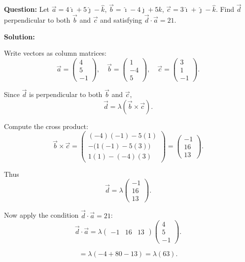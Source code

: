 \documentclass[journal]{IEEEtran}
\begin{document}
\textbf{Question:}  
Let $\vec a = 4\hat\imath+5\hat\jmath-\hat k$, $\vec b=\hat\imath-4\hat\jmath+5\hat k$, $\vec c=3\hat\imath+\hat\jmath-\hat k$.  
Find $\vec d$ perpendicular to both $\vec b$ and $\vec c$ and satisfying $\vec d\cdot\vec a=21$.

\medskip

\textbf{Solution:}  

Write vectors as column matrices:
\[
\vec a=\begin{pmatrix}4\\5\\-1\end{pmatrix},\quad
\vec b=\begin{pmatrix}1\\-4\\5\end{pmatrix},\quad
\vec c=\begin{pmatrix}3\\1\\-1\end{pmatrix}.
\]

Since $\vec d$ is perpendicular to both $\vec b$ and $\vec c$,  
\[
\vec d = \lambda(\vec b\times \vec c).
\]

Compute the cross product:
\[
\vec b\times \vec c =\begin{pmatrix}
(-4)(-1)-5(1)\\[6pt]
-\big(1(-1)-5(3)\big)\\[6pt]
1(1)-(-4)(3)
\end{pmatrix}
=
\begin{pmatrix}-1\\16\\13\end{pmatrix}.
\]

Thus
\[
\vec d = \lambda \begin{pmatrix}-1\\16\\13\end{pmatrix}.
\]

Now apply the condition $\vec d\cdot \vec a = 21$:
\[
\vec d \cdot \vec a 
= \lambda \begin{pmatrix}-1 & 16 & 13\end{pmatrix}
\begin{pmatrix}4\\5\\-1\end{pmatrix}.
\]

\[
= \lambda(-4+80-13)=\lambda(63).
\]
\end{document}
